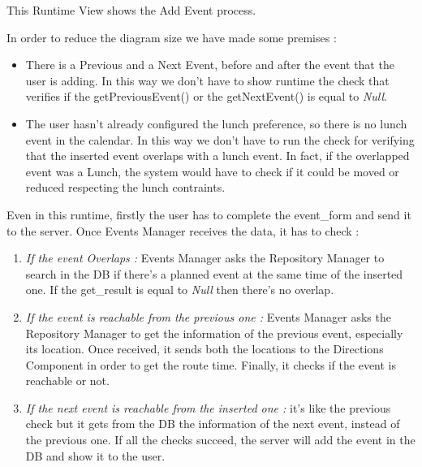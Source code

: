 This Runtime View shows the Add Event process.\par
In order to reduce the diagram size we have made some premises :
\begin{itemize}
	\setlength{\leftskip}{1cm}
	\item There is a Previous and a Next Event, before and after the event that the user is adding. In this way we don’t have to show runtime the check that verifies if the getPreviousEvent() or the getNextEvent() is equal to \emph{Null}.
	\item The user hasn’t already configured the lunch preference, so there is no lunch event in the calendar. In this way we don’t have to run the check for verifying that the inserted event overlaps with a lunch event. In fact, if the overlapped event was a Lunch, the system would have to check if it could be moved or reduced respecting the lunch contraints.
\end{itemize}\par
Even in this runtime, firstly the user has to complete the event\_form and send it to the server.
Once Events Manager receives the data, it has to check :
\begin{enumerate}
	\setlength{\leftskip}{1cm}
	\item \emph{If the event Overlaps :} Events Manager asks the Repository Manager to search in the DB if there’s a planned event at the same time of the inserted one. If the get\_result is equal to \emph{Null} then there’s no overlap.
	\item \emph{If the event is reachable from the previous one :} Events Manager asks the Repository Manager to get the information of the previous event, especially its location. Once received, it sends both the locations to the Directions Component in order to get the route time. Finally, it checks if the event is reachable or not.
	\item \emph{If the next event is reachable from the inserted one :} it’s like the previous check but it gets from the DB the information of the next event, instead of the previous one.
	If all the checks succeed, the server will add the event in the DB and show it to the user.
\end{enumerate}
